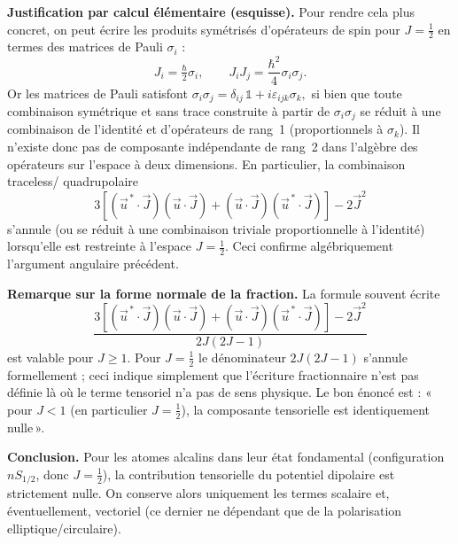 \noindent\textbf{Justification par calcul élémentaire (esquisse).}
Pour rendre cela plus concret, on peut écrire les produits symétrisés d'opérateurs de spin pour \(J=\tfrac12\) en termes des matrices de Pauli \(\sigma_i\) :
\[
J_i=\tfrac{\hbar}{2}\sigma_i,\qquad
J_iJ_j=\frac{\hbar^2}{4}\sigma_i\sigma_j.
\]
Or les matrices de Pauli satisfont
\(
\sigma_i\sigma_j=\delta_{ij}\,\mathbb{1}+ i\varepsilon_{ijk}\sigma_k,
\)
si bien que toute combinaison symétrique et sans trace construite à partir de \(\sigma_i\sigma_j\) se réduit à une combinaison de l'identité et d'opérateurs de rang~1 (proportionnels à \(\sigma_k\)). Il n'existe donc pas de composante indépendante de rang~2 dans l'algèbre des opérateurs sur l'espace à deux dimensions. En particulier, la combinaison traceless/ quadrupolaire
\[
3[(\vec{u}^{\,*}\!\cdot \vec{J})(\vec{u}\!\cdot\vec{J})+(\vec{u}\!\cdot\vec{J})(\vec{u}^{\,*}\!\cdot\vec{J})]-2\vec{J}^2
\]
s'annule (ou se réduit à une combinaison triviale proportionnelle à l'identité) lorsqu'elle est restreinte à l'espace \(J=\tfrac12\). Ceci confirme algébriquement l'argument angulaire précédent.

\medskip

\noindent\textbf{Remarque sur la forme normale de la fraction.}
La formule souvent écrite
\[
\frac{3[(\vec{u}^{\,*}\!\cdot \vec{J})(\vec{u}\!\cdot\vec{J})+(\vec{u}\!\cdot\vec{J})(\vec{u}^{\,*}\!\cdot \vec{J})]-2\vec{J}^2}{2J(2J-1)}
\]
est valable pour \(J\ge1\). Pour \(J=\tfrac12\) le dénominateur \(2J(2J-1)\) s'annule formellement ; ceci indique simplement que l'écriture fractionnaire n'est pas définie là où le terme tensoriel n'a pas de sens physique. Le bon énoncé est : «\,pour \(J<1\) (en particulier \(J=\tfrac12\)), la composante tensorielle est identiquement nulle\,».

\medskip

\noindent\textbf{Conclusion.}
Pour les atomes alcalins dans leur état fondamental (configuration \(nS_{1/2}\), donc \(J=\tfrac12\)), la contribution tensorielle du potentiel dipolaire est strictement nulle. On conserve alors uniquement les termes scalaire et, éventuellement, vectoriel (ce dernier ne dépendant que de la polarisation elliptique/circulaire).
